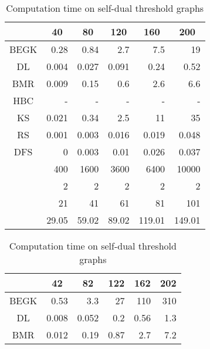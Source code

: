 \begin{table}
\begin{minipage}{172pt}
\begin{center}
\caption{Computation time on threshold graphs}
\label{threshold}
\begin{tabular}[c]{| r | r | r | r | r | r |}
\hline
\multicolumn{1}{|c||}{} & \multicolumn{1}{|c|}{40} & \multicolumn{1}{|c|}{80} & \multicolumn{1}{|c|}{120} & \multicolumn{1}{|c|}{160} & \multicolumn{1}{|c|}{200}\\\hline
\multicolumn{1}{|c||}{BEGK} & 0.28 & 0.84 & 2.7 & 7.5 & 19 \\\hline
\multicolumn{1}{|c||}{DL} & 0.004 & 0.027 & 0.091 & 0.24 & 0.52 \\\hline
\multicolumn{1}{|c||}{BMR} & 0.009 & 0.15 & 0.6 & 2.6 & 6.6 \\\hline
\multicolumn{1}{|c||}{HBC} & - & - & - & - & - \\\hline
\multicolumn{1}{|c||}{KS} & 0.021 & 0.34 & 2.5 & 11 & 35 \\\hline
\multicolumn{1}{|c||}{RS} & 0.001 & 0.003 & 0.016 & 0.019 & 0.048\\\hline
\multicolumn{1}{|c||}{DFS} & 0 & 0.003 & 0.01 & 0.026 & 0.037\\\hline
\hline
\multicolumn{1}{|c||}{} & 400 & 1600 & 3600 & 6400 & 10000\\\hline
\multicolumn{1}{|c||}{} & 2 & 2 & 2 & 2 & 2\\\hline
\multicolumn{1}{|c||}{} & 21 & 41 & 61 & 81 & 101\\\hline
\multicolumn{1}{|c||}{} & 29.05 & 59.02 & 89.02 &119.01 & 149.01 \\\hline
\end{tabular}
\end{center}
\end{minipage}
\begin{minipage}{172pt}
\begin{center}
\caption{Computation time on self-dual threshold graphs}
\label{sd_threshold}
\begin{tabular}[c]{| r| r | r | r | r | r |}
\hline
\multicolumn{1}{|c||}{} & \multicolumn{1}{|c|}{42} & \multicolumn{1}{|c|}{82} & \multicolumn{1}{|c|}{122} & \multicolumn{1}{|c|}{162} & \multicolumn{1}{|c|}{202}\\\hline
\multicolumn{1}{|c||}{BEGK} & 0.53 & 3.3 & 27 & 110 & 310 \\\hline
\multicolumn{1}{|c||}{DL} & 0.008 & 0.052 & 0.2 & 0.56 & 1.3 \\\hline
\multicolumn{1}{|c||}{BMR} & 0.012 & 0.19 & 0.87 & 2.7 & 7.2 \\\hline

\end{tabular}
\end{center}
\end{minipage}
\end{table}
